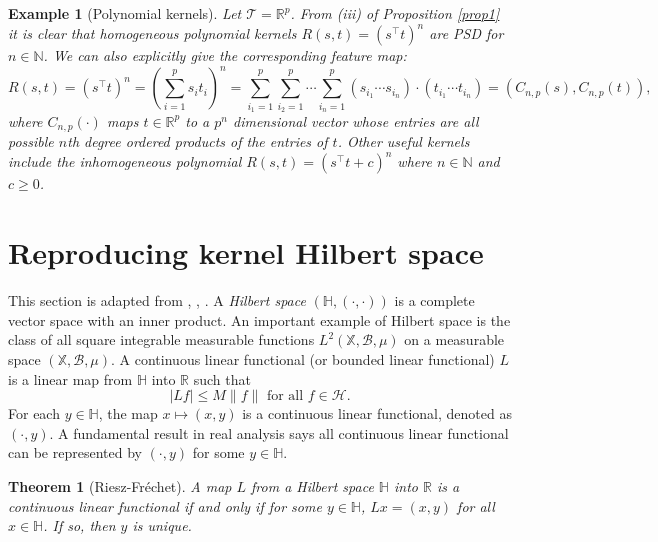 \documentclass[11pt]{article}
\theoremstyle{plain}
\newtheorem{theorem}{\quad\quad Theorem}
\newtheorem{example}{Example}
\theoremstyle{definition}
\theoremstyle{remark}
\begin{document}
\begin{example}[Polynomial kernels]
    Let $\mathcal{T}=\mathbb{R}^p$. 
    From (iii) of Proposition \ref{prop1} it is clear that homogeneous polynomial kernels $R(s,t)= (s^\top t)^n$ are PSD for $n\in \mathbb N$.
    We can also explicitly give the corresponding feature map:
    \begin{equation*}
        R(s,t)=(s^\top t)^n
        =(\sum_{i=1}^p s_i t_i)^n
        =\sum_{i_1=1}^p \sum_{i_2=1}^p \cdots \sum_{i_n=1}^p (s_{i_1}\cdots s_{i_n}) \cdot (t_{i_1}\cdots t_{i_n})
        =(C_{n,p}(s),C_{n,p}(t)),
    \end{equation*}
    where $C_{n,p}(\cdot)$ maps $t\in \mathbb R^p$ to a $p^n$ dimensional vector whose entries are all possible $n$th degree ordered products of the entries of $t$.
    Other useful kernels include the inhomogeneous polynomial $R(s,t)=(s^\top t +c)^n$ where $n\in\mathbb N$ and $c\geq 0$.
\end{example}




\section{Reproducing kernel Hilbert space}
This section is adapted from \cite{book:1273182}, \cite{book:274797}, \cite{book:1323324}.
A \emph{Hilbert space} $(\mathbb{H},(\cdot,\cdot))$ is a complete vector space with an inner product.
An important example of Hilbert space is the class of all square integrable measurable functions $L^2(\mathbb{X},\mathcal{B},\mu)$ on a measurable space $(\mathbb{X},\mathcal{B},\mu)$.
A continuous linear functional (or bounded linear functional) $L$ is a linear map from $\mathbb{H}$ into $\mathbb{R}$ such that
\begin{equation*}
    |Lf|\leq M \|f\| \text{ for all $f\in \mathcal{H}$}.
\end{equation*}
For each $y\in \mathbb{H}$, the map $x\mapsto (x,y)$ is a continuous linear functional, denoted as $(\cdot,y)$.
A fundamental result in real analysis says all continuous linear functional can be represented by $(\cdot,y)$ for some $y\in \mathbb{H}$.
\begin{theorem}[Riesz-Fr\'echet]\label{RFTheorem}
    A map $L$ from a Hilbert space $\mathbb{H}$ into $\mathbb{R}$ is a continuous linear functional if and only if for some $y\in \mathbb{H}$, $Lx=(x,y)$ for all $x\in \mathbb{H}$. If so, then $y$ is unique.
\end{theorem}
\end{document}
